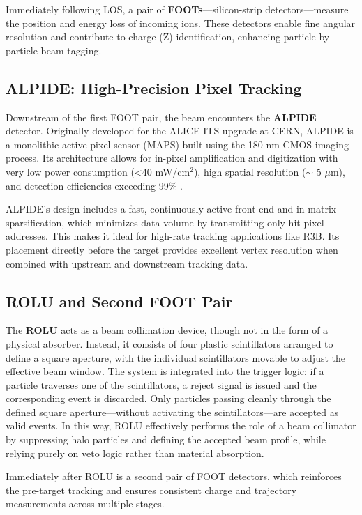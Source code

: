 Immediately following LOS, a pair of \textbf{FOOTs}—silicon-strip detectors—measure the position and energy loss of incoming ions. These detectors enable fine angular resolution and contribute to charge (Z) identification, enhancing particle-by-particle beam tagging.


\subsection{ALPIDE: High-Precision Pixel Tracking}

Downstream of the first FOOT pair, the beam encounters the \textbf{ALPIDE} detector. Originally developed for the ALICE ITS upgrade at CERN, ALPIDE is a monolithic active pixel sensor (MAPS) built using the 180 nm CMOS imaging process. Its architecture allows for in-pixel amplification and digitization with very low power consumption (<40 mW/cm$^2$), high spatial resolution ($\sim$ 5 $\mu$m), and detection efficiencies exceeding 99\% \cite{mager_alpide_2016}.

ALPIDE's design includes a fast, continuously active front-end and in-matrix sparsification, which minimizes data volume by transmitting only hit pixel addresses. This makes it ideal for high-rate tracking applications like \gls{R3B}. Its placement directly before the target provides excellent vertex resolution when combined with upstream and downstream tracking data.

\subsection{ROLU and Second FOOT Pair}

The \textbf{ROLU} acts as a beam collimation device, though not in the form of a physical absorber. Instead, it consists of four plastic scintillators arranged to define a square aperture, with the individual scintillators movable to adjust the effective beam window. The system is integrated into the trigger logic: if a particle traverses one of the scintillators, a reject signal is issued and the corresponding event is discarded. Only particles passing cleanly through the defined square aperture—without activating the scintillators—are accepted as valid events. In this way, ROLU effectively performs the role of a beam collimator by suppressing halo particles and defining the accepted beam profile, while relying purely on veto logic rather than material absorption.

Immediately after ROLU is a second pair of FOOT detectors, which reinforces the pre-target tracking and ensures consistent charge and trajectory measurements across multiple stages.


